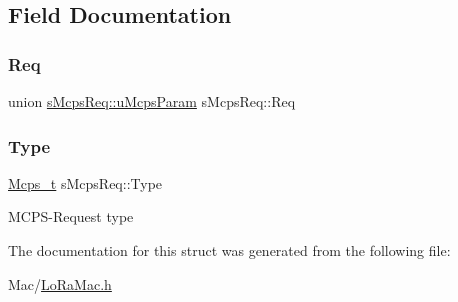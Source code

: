 \subsection{Field Documentation}
\mbox{\label{structsMcpsReq_a36a00aadc44825e3235a1652bd7911d6}} 
\subsubsection{\texorpdfstring{Req}{Req}}
{\footnotesize\ttfamily union \hyperlink{unionsMcpsReq_1_1uMcpsParam}{s\+Mcps\+Req\+::u\+Mcps\+Param} s\+Mcps\+Req\+::\+Req}

\mbox{\label{structsMcpsReq_a9c0265d5c764fb2b0119c932b896f826}} 
\subsubsection{\texorpdfstring{Type}{Type}}
{\footnotesize\ttfamily \hyperlink{group__LORAMAC_ga670d0c87a52aeb13391f303a4cf94f00}{Mcps\+\_\+t} s\+Mcps\+Req\+::\+Type}

M\+C\+P\+S-\/\+Request type 

The documentation for this struct was generated from the following file\+:\begin{DoxyCompactItemize}
\item 
Mac/\hyperlink{LoRaMac_8h}{Lo\+Ra\+Mac.\+h}\end{DoxyCompactItemize}

